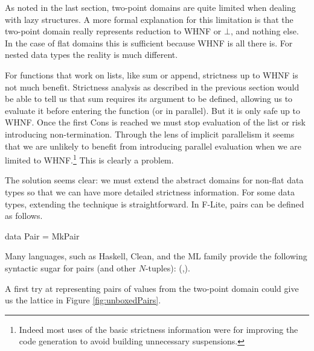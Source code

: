 As noted in the last section, two-point domains are quite limited when dealing
with lazy structures. A more formal explanation for this limitation is that the
two-point domain really represents reduction to WHNF or $\bot$, and nothing
else. In the case of flat domains this is sufficient because WHNF is all there
is. For nested data types the reality is much different. 

For functions that work on lists, like \<sum\> or \<append\>, strictness up to
WHNF is not much benefit. Strictness analysis as described in the previous
section would be able to tell us that \<sum\> requires its argument to be
defined, allowing us to evaluate it before entering the function (or in
parallel). But it is only safe up to WHNF. Once the first \<Cons\> is reached
we must stop evaluation of the list or risk introducing non-termination.
Through the lens of implicit parallelism it seems that we are unlikely to
benefit from introducing parallel evaluation when we are limited to
WHNF.\footnote{Indeed most uses of the basic strictness information were for
improving the code generation to avoid building unnecessary suspensions.} This
is clearly a problem.

The solution seems clear: we must extend the abstract domains for non-flat data
types so that we can have more detailed strictness information. For some data
types, extending the technique is straightforward. In F-Lite, pairs can be
defined as follows.

\begin{haskell*}
data Pair \hasalpha \hasbeta = MkPair \hasalpha \hasbeta
\end{haskell*}

Many languages, such as Haskell, Clean, and the ML family provide the following
syntactic sugar for pairs (and other $N$-tuples): \<(\hasalpha,\hasbeta)\>.

A first try at representing pairs of values from the two-point domain could
give us the lattice in Figure \ref{fig:unboxedPairs}.

